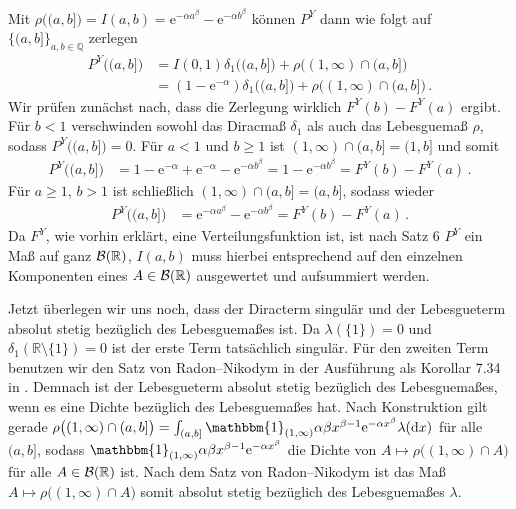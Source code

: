 \documentclass{article}
\begin{document}
Mit $\rho\bigl((a,b]\bigr)=I(a,b)=\mathrm{e}^{-\alpha a^\beta}-\mathrm{e}^{-\alpha b^\beta}$ können $P^Y$ dann wie folgt auf $\{(a,b]\}_{a,b\in\mathbb{Q}}$ zerlegen
\begin{align*}
  P^Y\bigl((a,b]\bigr)
  &=I(0,1)\delta_1\bigl((a,b]\bigr)+\rho\bigl((1,\infty)\cap(a,b]\bigr)\\
  &=(1-\mathrm{e}^{-\alpha})\delta_1\bigl((a,b]\bigr)+\rho\bigl((1,\infty)\cap(a,b]\bigr)\,.
\end{align*}
Wir prüfen zunächst nach, dass die Zerlegung wirklich $F^Y(b)-F^Y(a)$ ergibt.
Für $b<1$ verschwinden sowohl das Diracmaß $\delta_1$ als auch das Lebesguemaß $\rho$, sodass $P^Y\bigl((a,b]\bigr)=0$.
Für $a<1$ und $b\geq1$ ist $(1,\infty)\cap(a,b]=(1,b]$ und somit
\begin{align*}
  P^Y\bigl((a,b]\bigr)
  &=1-\mathrm{e}^{-\alpha}+\mathrm{e}^{-\alpha}-\mathrm{e}^{-\alpha b^\beta}=1-\mathrm{e}^{-\alpha b^\beta}=F^Y(b)-F^Y(a)\,.
\end{align*}
Für $a\geq1$, $b>1$ ist schließlich $(1,\infty)\cap(a,b]=(a,b]$, sodass wieder
\begin{align*}
  P^Y\bigl((a,b]\bigr)
  &=\mathrm{e}^{-\alpha a^\beta}-\mathrm{e}^{-\alpha b^\beta}=F^Y(b)-F^Y(a)\,.
\end{align*}
Da $F^Y$, wie vorhin erklärt, eine Verteilungsfunktion ist, ist nach Satz 6 $P^Y$ ein Maß auf ganz ${\cal B}(\mathbb{R})$, $I(a,b)$ muss hierbei entsprechend auf den einzelnen Komponenten eines $A\in{\cal B}(\mathbb{R})$ ausgewertet und aufsummiert werden.

Jetzt überlegen wir uns noch, dass der Diracterm singulär und der Lebesgueterm absolut stetig bezüglich des Lebesguemaßes ist.
Da $\lambda(\{1\})=0$ und $\delta_1(\mathbb{R}\setminus\{1\})=0$ ist der erste Term tatsächlich singulär.
Für den zweiten Term benutzen wir den Satz von Radon--Nikodym in der Ausführung als Korollar 7.34 in \cite{klenke}.
Demnach ist der Lebesgueterm absolut stetig bezüglich des Lebesguemaßes, wenn es eine Dichte bezüglich des Lebesguemaßes hat.
Nach Konstruktion gilt gerade $\rho\bigl((1,\infty)\cap(a,b]\bigr)=\int_{(a,b]}\mathbbm{1}_{(1,\infty)}\alpha\beta x^{\beta-1}\mathrm{e}^{-\alpha x^\beta}\lambda(\mathrm{d}x)$ für alle $(a,b]$, sodass $\mathbbm{1}_{(1,\infty)}\alpha\beta x^{\beta-1}\mathrm{e}^{-\alpha x^\beta}$ die Dichte von $A\mapsto\rho\bigl((1,\infty)\cap A\bigr)$ für alle $A\in{\cal B}(\mathbb{R})$ ist.
Nach dem Satz von Radon--Nikodym ist das Maß $A\mapsto\rho\bigl((1,\infty)\cap A\bigr)$ somit absolut stetig bezüglich des Lebesguemaßes $\lambda$.

\end{document}
